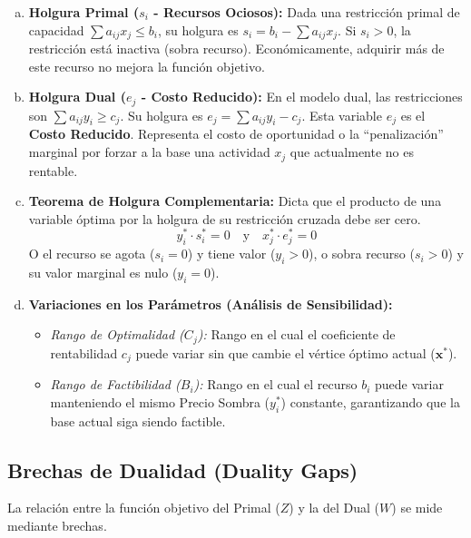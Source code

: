 \documentclass{article}
\begin{document}
	\begin{enumerate}[a)]
		\item \textbf{Holgura Primal ($s_i$ - Recursos Ociosos):} 
		Dada una restricción primal de capacidad $\sum a_{ij} x_j \leq b_i$, su holgura es $s_i = b_i - \sum a_{ij} x_j$. Si $s_i > 0$, la restricción está inactiva (sobra recurso). Económicamente, adquirir más de este recurso no mejora la función objetivo.
		
		\item \textbf{Holgura Dual ($e_j$ - Costo Reducido):}
		En el modelo dual, las restricciones son $\sum a_{ij} y_i \geq c_j$. Su holgura es $e_j = \sum a_{ij} y_i - c_j$. Esta variable $e_j$ es el \textbf{Costo Reducido}. Representa el costo de oportunidad o la ``penalización'' marginal por forzar a la base una actividad $x_j$ que actualmente no es rentable.
			
		\item \textbf{Teorema de Holgura Complementaria:}
		Dicta que el producto de una variable óptima por la holgura de su restricción cruzada debe ser cero.
		$$y_i^* \cdot s_i^* = 0 \quad \text{y} \quad x_j^* \cdot e_j^* = 0$$
		O el recurso se agota ($s_i = 0$) y tiene valor ($y_i > 0$), o sobra recurso ($s_i > 0$) y su valor marginal es nulo ($y_i = 0$).
		
		\item \textbf{Variaciones en los Parámetros (Análisis de Sensibilidad):}
		\begin{itemize}
			\item \textit{Rango de Optimalidad ($C_j$):} Rango en el cual el coeficiente de rentabilidad $c_j$ puede variar sin que cambie el vértice óptimo actual ($\mathbf{x}^*$).
			\item \textit{Rango de Factibilidad ($B_i$):} Rango en el cual el recurso $b_i$ puede variar manteniendo el mismo Precio Sombra ($y_i^*$) constante, garantizando que la base actual siga siendo factible.
		\end{itemize}
	\end{enumerate}
	
	\subsection{Brechas de Dualidad (Duality Gaps)}
	La relación entre la función objetivo del Primal ($Z$) y la del Dual ($W$) se mide mediante brechas.
	
\end{document}
